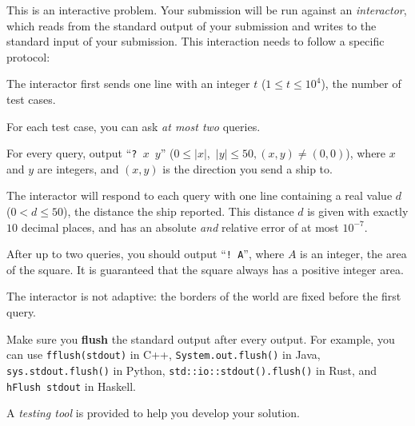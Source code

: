 
	This is an interactive problem.
    Your submission will be run against an \emph{interactor},
    which reads from the standard output of your submission
    and writes to the standard input of your submission.
    This interaction needs to follow a specific protocol:

	The interactor first sends one line with an integer $t$ ($1 \leq t \leq 10^4$), the number of test cases.

    For each test case, you can ask \emph{at most two} queries.

    For every query, output ``\texttt{?~$x$~$y$}'' ($0 \leq \left| x \right|$,~$\left| y \right| \leq 50, (x, y) \neq (0, 0)$), where $x$ and $y$ are integers, and $(x, y)$ is the direction you send a ship to.

	The interactor will respond to each query with one line containing a real value $d$ ($0 < d \leq 50$), the distance the ship reported.
    This distance $d$ is given with exactly $10$ decimal places, and has an absolute \emph{and} relative error of at most $10^{-7}$.

    After up to two queries, you should output ``\texttt{!~A}'', where $A$ is an integer, the area of the square.
	It is guaranteed that the square always has a positive integer area.

	The interactor is not adaptive: the borders of the world are fixed before the first query.

    Make sure you \textbf{flush} the standard output after every output.
    For example, you can use \texttt{fflush(stdout)} in C++, \texttt{System.out.flush()} in Java, \texttt{sys.stdout.flush()} in Python, \texttt{std::io::stdout().flush()} in Rust, and \texttt{hFlush stdout} in Haskell.

    A \emph{testing tool} is provided to help you develop your solution.
